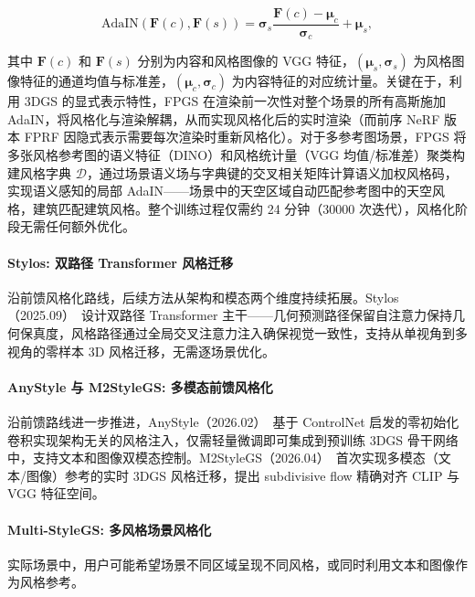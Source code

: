 \begin{equation}
  \text{AdaIN}(\mathbf{F}(c), \mathbf{F}(s)) = \boldsymbol{\sigma}_s \frac{\mathbf{F}(c) - \boldsymbol{\mu}_c}{\boldsymbol{\sigma}_c} + \boldsymbol{\mu}_s,
\end{equation}

其中 $\mathbf{F}(c)$ 和 $\mathbf{F}(s)$ 分别为内容和风格图像的 VGG 特征，$(\boldsymbol{\mu}_s, \boldsymbol{\sigma}_s)$ 为风格图像特征的通道均值与标准差，$(\boldsymbol{\mu}_c, \boldsymbol{\sigma}_c)$ 为内容特征的对应统计量。关键在于，利用 3DGS 的显式表示特性，FPGS 在渲染前一次性对整个场景的所有高斯施加 AdaIN，将风格化与渲染解耦，从而实现风格化后的实时渲染（而前序 NeRF 版本 FPRF 因隐式表示需要每次渲染时重新风格化）。对于多参考图场景，FPGS 将多张风格参考图的语义特征（DINO）和风格统计量（VGG 均值/标准差）聚类构建风格字典 $\mathcal{D}$，通过场景语义场与字典键的交叉相关矩阵计算语义加权风格码，实现语义感知的局部 AdaIN——场景中的天空区域自动匹配参考图中的天空风格，建筑匹配建筑风格。整个训练过程仅需约 24 分钟（30000 次迭代），风格化阶段无需任何额外优化。

\paragraph{Stylos: 双路径 Transformer 风格迁移}

沿前馈风格化路线，后续方法从架构和模态两个维度持续拓展。Stylos（2025.09）~\cite{2509_26455}设计双路径 Transformer 主干——几何预测路径保留自注意力保持几何保真度，风格路径通过全局交叉注意力注入确保视觉一致性，支持从单视角到多视角的零样本 3D 风格迁移，无需逐场景优化。

\paragraph{AnyStyle 与 M2StyleGS: 多模态前馈风格化}

沿前馈路线进一步推进，AnyStyle（2026.02）~\cite{2602_04043}基于 ControlNet 启发的零初始化卷积实现架构无关的风格注入，仅需轻量微调即可集成到预训练 3DGS 骨干网络中，支持文本和图像双模态控制。M2StyleGS（2026.04）~\cite{2604_03773}首次实现多模态（文本/图像）参考的实时 3DGS 风格迁移，提出 subdivisive flow 精确对齐 CLIP 与 VGG 特征空间。

\paragraph{Multi-StyleGS: 多风格场景风格化}

实际场景中，用户可能希望场景不同区域呈现不同风格，或同时利用文本和图像作为风格参考。

